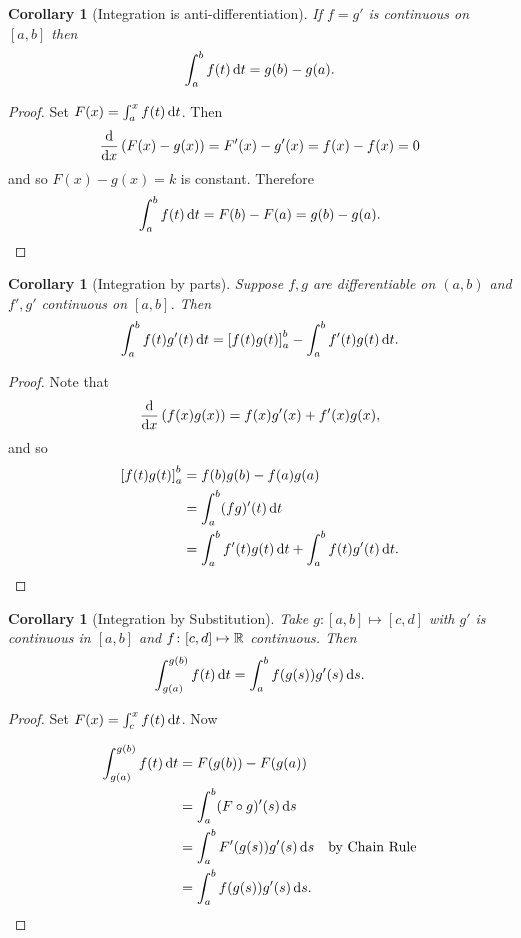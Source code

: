 \documentclass{notes}
\theoremstyle{plain}
\newtheorem{corollary}[proposition]{Corollary}
\begin{document}
\begin{corollary}[Integration is anti-differentiation]

If $ f=g' $ is continuous on $ [a,b] $ then
\[ \int_{a}^{b}f(t)\,\mathrm{d} t = g(b)-g(a). \]
\end{corollary}

\begin{proof}
Set  $F(x) = \int_{a}^{x}f(t)\, \mathrm{d} t$.
Then 
\[
\frac{\mathrm{d}}{\mathrm{d} x} \left( F(x)-g(x) \right) = F'(x)-g'(x)=f(x)-f(x)=0
\]
and so $ F(x)-g(x)=k $ is constant.  Therefore
\[
\int_{a}^{b}f(t)\,\mathrm{d} t = F(b)-F(a) = g(b)-g(a).
\]
\end{proof}

\begin{corollary}[Integration by parts]
Suppose $ f,g $ are differentiable on $ (a,b) $ and $ f',g' $ continuous 
on $ [a,b] $.
Then
\[
\int_{a}^{b}f(t)g'(t)\,\mathrm{d} t = \left[ f(t)g(t) \right]^{b}_{a} - 
\int_{a}^{b}f'(t)g(t)\,\mathrm{d} t.
\]
\end{corollary}

\begin{proof}
Note that
\[ \frac{\mathrm{d}}{\mathrm{d} x} \left( f(x)g(x) \right) = f(x)g'(x)+f'(x)g(x), \]
and so
\begin{align*}
\left[ f(t)g(t) \right]^{b}_{a} & = f(b)g(b)-f(a)g(a) \\
& = \int_{a}^{b}(fg)'(t)\,\mathrm{d} t \\
& = \int_{a}^{b}f'(t)g(t)\,\mathrm{d} t + \int_{a}^{b}f(t)g'(t)\,\mathrm{d} t.
\end{align*}
\end{proof}


\begin{corollary}[Integration by Substitution]
Take $ g\colon [a,b] \mapsto [c,d] $ with $ g' $ is continuous in $ 
[a,b] $ and $ f\colon [c,d] \mapsto \mathbb{R} $ continuous.
Then
\[
\int_{g(a)}^{g(b)}f(t)\, \mathrm{d} t = \int_{a}^{b}f(g(s))g'(s)\,\mathrm{d} s.
\]
\end{corollary}

\begin{proof}
Set $F(x)=\int_{c}^{x}f(t)\,\mathrm{d} t$. Now

\begin{align*}
\int_{g(a)}^{g(b)}f(t)\,\mathrm{d} t & = F(g(b))-F(g(a)) \\
& = \int_{a}^{b}(F \circ g)'(s)\,\mathrm{d} s \\
& = \int_{a}^{b}F'(g(s))g'(s)\,\mathrm{d} s \quad \text{by Chain Rule} \\
& = \int_{a}^{b}f(g(s))g'(s)\,\mathrm{d} s.
\end{align*}
\end{proof}
\end{document}

